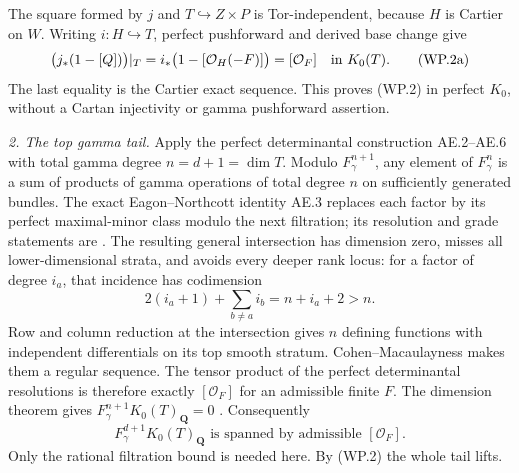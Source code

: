 The square formed by $j$ and $T\hookrightarrow Z\times P$ is
Tor-independent, because $H$ is Cartier on $W$.
Writing $i:H\hookrightarrow T$, perfect pushforward and derived
base change give
\begin{equation}
 \bigl(j_*(1-[Q])\bigr)|_T
   =i_*\bigl(1-[\mathcal O_H(-F)]\bigr)
   =[\mathcal O_F]\quad\hbox{in }K_0(T).              \tag{WP.2a}
\end{equation}
The last equality is the Cartier exact sequence.  This proves
(WP.2) in perfect $K_0$, without a Cartan injectivity or gamma
pushforward assertion.

\emph{2. The top gamma tail.}
Apply the perfect determinantal construction AE.2--AE.6 with total
gamma degree $n=d+1=\dim T$.  Modulo $F_\gamma^{n+1}$, any element
of $F_\gamma^n$ is a sum of products of gamma operations of total
degree $n$ on sufficiently generated bundles.  The exact
Eagon--Northcott identity AE.3 replaces each factor by its perfect
maximal-minor class modulo the next filtration; its resolution
and grade statements are
\citet[Section 2.C; Theorems 2.1 and 2.16]
{D_BrunsVetter1988Determinantal}.
The resulting general intersection has dimension zero, misses all
lower-dimensional strata, and avoids every deeper rank locus:
for a factor of degree $i_a$, that incidence has codimension
\[
       2(i_a+1)+\sum_{b\ne a}i_b=n+i_a+2>n.
\]
Row and column reduction at the intersection gives $n$ defining
functions with independent differentials on its top smooth stratum.
Cohen--Macaulayness makes them a regular sequence.  The tensor
product of the perfect determinantal resolutions is therefore
exactly $[\mathcal O_F]$ for an admissible finite $F$.
The dimension theorem gives
$F_\gamma^{n+1}K_0(T)_{\mathbf Q}=0$
\citep[Chapter II, Remark 8.8.5]{D_Weibel2013KbookII}.
Consequently
\begin{equation}
 F_\gamma^{d+1}K_0(T)_{\mathbf Q}
   \text{ is spanned by admissible }[\mathcal O_F].    \tag{WP.3}
\end{equation}
Only the rational filtration bound is needed here.  By (WP.2)
the whole tail lifts.

